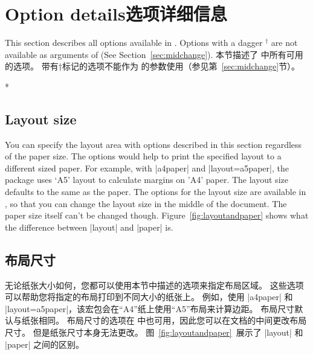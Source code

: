 \section{Option details\hfill 选项详细信息}
\begin{paracol}{2}
This section describes all options available in \Gm.
Options with a dagger $^\dagger$ are not available 
as arguments of  (See Section~\ref{sec:midchange}).
\switchcolumn
本节描述了 \Gm 中所有可用的选项。
带有†标记的选项不能作为  的参数使用（参见第~\ref{sec:midchange}节）。
\end{paracol}

% 

\begin{paracol}{2}
\switchcolumn[0]*
\subsection{Layout size}
You can specify the layout area with options described in this
section regardless of the paper size.
The options would help to print the specified layout to a different
sized paper.  For example, with |a4paper| and |layout=a5paper|, the
package uses `A5' layout to calculate margins on 'A4' paper.
The layout size defaults to the same as the paper.
The options for the layout size are available in ,
so that you can change the layout size in the middle of the document.
The paper size itself can't be changed though.
Figure~\ref{fig:layoutandpaper} shows what the difference between
|layout| and |paper| is.
\switchcolumn
\subsection{布局尺寸}

无论纸张大小如何，您都可以使用本节中描述的选项来指定布局区域。
这些选项可以帮助您将指定的布局打印到不同大小的纸张上。
例如，使用 |a4paper| 和 |layout=a5paper|，该宏包会在“A4”纸上使用“A5”布局来计算边距。
布局尺寸默认与纸张相同。
布局尺寸的选项在  中也可用，因此您可以在文档的中间更改布局尺寸。
但是纸张尺寸本身无法更改。
图~\ref{fig:layoutandpaper}~展示了 |layout| 和 |paper| 之间的区别。
\end{paracol}


